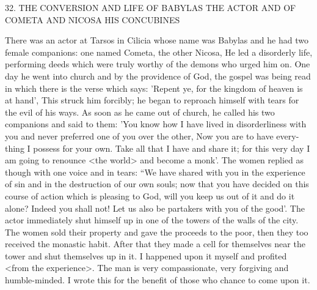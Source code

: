 32.
THE CONVERSION AND LIFE OF BABYLAS
THE ACTOR AND OF COMETA AND NICOSA
HIS CONCUBINES

There was an actor at Tarsos in Cilicia whose name was Babylas
and he had two female companions: one named Cometa, the other
Nicosa, He led a disorderly life, performing deeds which were truly
worthy of the demons who urged him on.
One day he went into
church and by the providence of God, the gospel was being read in
which there is the verse which says: 'Repent ye, for the kingdom of
heaven is at hand', This struck him forcibly; he began to reproach
himself with tears for the evil of his ways.
As soon as he came out
of church, he called his two companions and said to them: 'You
know how I have lived in disorderliness with you and never
preferred one of you over the other, Now you are to have every-
thing I possess for your own.
Take all that I have and share it; for
this very day I am going to renounce <the world> and become a
monk'.
The women replied as though with one voice and in tears:
“We have shared with you in the experience of sin and in the
destruction of our own souls; now that you have decided on this
course of action which is pleasing to God, will you keep us out of
it and do it alone? Indeed you shall not! Let us also be partakers
with you of the good'.
The actor immediately shut himself up in one
of the towers of the walls of the city.
The women sold their property
and gave the proceeds to the poor, then they too received the
monastic habit.
After that they made a cell for themselves near the
tower and shut themselves up in it.
I happened upon it myself and
profited <from the experience>.
The man is very compassionate,
very forgiving and humble-minded.
I wrote this for the benefit of
those who chance to come upon it.

